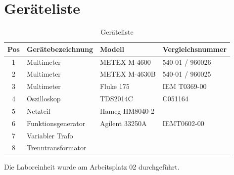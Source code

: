 \section{Geräteliste}\label{sec:geraeteliste}

\begin{table}[h]
    \centering
    \caption{Geräteliste}\label{tab:geraeteliste}
    \begin{tabularx}{\columnwidth}{cXXX}
        Pos & \textbf{Gerätebezeichnung} & \textbf{Modell} & \textbf{Vergleichsnummer}\\ \midrule
        1 & Multimeter & METEX M-4600 & 540-01 / 960026\\
        2 & Multimeter & METEX M-4630B & 540-01 / 960025\\
        3 & Multimeter & Fluke 175 & IEM T0369-00\\
        4 & Oszilloskop & TDS2014C & C051164\\
        5 & Netzteil & Hameg HM8040-2 & \\
        6 & Funktionsgenerator & Agilent 33250A & IEMT0602-00\\
        7 & Variabler Trafo & & \\
        8 & Trenntransformator & & \\
\end{tabularx}
\end{table}

Die Laboreinheit wurde am Arbeitsplatz 02 durchgeführt.